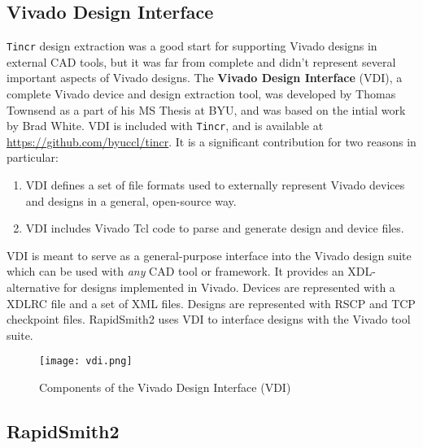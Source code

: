 \subsection{Vivado Design Interface}
\texttt{Tincr} design extraction was a good start for supporting Vivado designs
in external CAD tools, but it was far from complete and didn't represent several
important aspects of Vivado designs. The \textbf{Vivado Design Interface} (VDI),
a complete Vivado device and design extraction tool, was developed by Thomas
Townsend as a part of his MS Thesis at BYU, and was based on the intial work by
Brad White.
VDI is included with
\texttt{Tincr}, and is available at {\color{blue}
\url{https://github.com/byuccl/tincr}}. It is a  significant contribution for
two reasons in particular:

\begin{enumerate}
  \item VDI defines a set of file formats used to externally represent
  Vivado devices and designs in a general, open-source way.
  
  \item VDI includes Vivado Tcl code to parse and generate design and device
  files.
\end{enumerate}

\noindent VDI is meant to serve as a general-purpose interface into the Vivado
design suite which can be used with \textit{any} CAD tool or framework. It
provides an XDL-alternative for designs implemented in Vivado. Devices are
represented with a XDLRC file and a set of XML files. Designs are represented
with RSCP and TCP checkpoint files. RapidSmith2 uses VDI to interface designs
with the Vivado tool suite.

\begin{figure}[h!]
 \centering
 \texttt{[image: vdi.png]}
 \caption{Components of the Vivado Design Interface (VDI)}
 \label{fig:vdi}
\end{figure}

\subsection{RapidSmith2}

